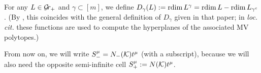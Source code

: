 \documentclass[draft]{article} %
\begin{document}

For any $ L \in \mathcal{G}\!r_+ $ and $\gamma \subset [m]$, we define $ D_\gamma(L) := \operatorname{rdim} L^\gamma = \operatorname{rdim} L - \operatorname{rdim} L_{\gamma^c}$. (By \cite[Proposition 9.3]{kamnitzer2010mirkovic}, this coincides with the general definition of $ D_\gamma$ given in that paper; in \textit{loc. cit.} these functions are used to compute the hyperplanes of the associated MV polytopes.) 

From now on, we will write $ S^\mu_- = N_-(\mathcal K) t^\mu$ (with a subscript), because we will also need the opposite semi-infinite cell $S^\mu_+ := N(\mathcal K)t^\mu$. %
% 
\end{document}
